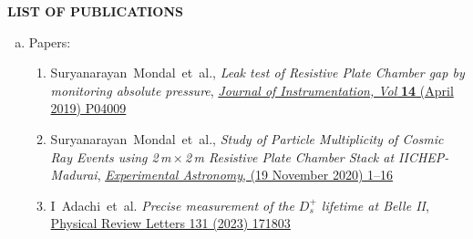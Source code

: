\documentclass[12pt]{article}
\begin{document}
\pagebreak
\vspace{0.4cm}
\colorbox{gray!40}{\begin{minipage}{17.5cm}
\bf {LIST OF PUBLICATIONS} 
\end{minipage} }
\begin{enumerate}[a.]
\item Papers:
  \begin{enumerate}[1.]
  \item Suryanarayan~Mondal~et~al., \emph{Leak test of Resistive Plate Chamber gap by monitoring absolute pressure}, \href{https://doi.org/10.1088/1748-0221/14/04/P04009}{\emph{Journal of Instrumentation, Vol} \textbf{14} (April 2019) P04009}
  \item Suryanarayan~Mondal~et~al., \emph{Study of Particle Multiplicity of Cosmic Ray Events using 2\,m\,$\times$\,2\,m Resistive Plate Chamber Stack at IICHEP-Madurai}, \href{https://doi.org/10.1007/s10686-020-09685-6}{\emph{Experimental Astronomy}, (19 November 2020) 1--16}
  \item I~Adachi~et~al. \emph{Precise measurement of the $D_s^+$ lifetime at Belle II}, \href{https://doi.org/10.1103/PhysRevLett.131.171803}{Physical Review Letters 131 (2023) 171803}

\end{enumerate}
\end{enumerate}
\end{document}
